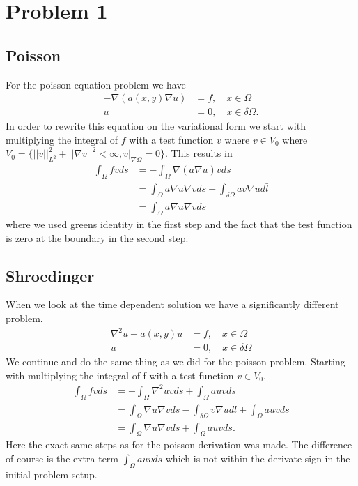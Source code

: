 \documentclass[11pt]{article}
\begin{document}
\section{Problem 1}
\subsection{Poisson}
For the poisson equation problem we have
\begin{align}
	-\nabla (a(x,y)\nabla u) &= f,\quad x\in \Omega \\
	u &= 0,\quad x\in \delta \Omega.
\end{align}
In order to rewrite this equation on the variational form we start with multiplying the integral of $f$ with a test function $v$ where $v\in V_0$ where $V_0 = \{ ||v||^2_{L^2} + ||\nabla v||^2 < \infty, v|_{\nabla \Omega} = 0\}$. This results in
\begin{align}
	\int_{\Omega} f v d s &= - \int_{\Omega} \nabla (a \nabla u) v ds \\
	&= \int_{\Omega} a \nabla u \nabla v ds - \int_{\delta \Omega} a v \nabla u d\bar{l} \\
	&= \int_{\Omega} a \nabla u \nabla v ds
\end{align}
where we used greens identity in the first step and the fact that the test function is zero at the boundary in the second step.
\subsection{Shroedinger}
When we look at the time dependent solution we have a significantly different problem.
\begin{align}
	\nabla^2 u + a(x,y) u &= f, \quad x\in \Omega \\
	u &= 0, \quad x \in \delta \Omega
\end{align}
We continue and do the same thing as we did for the poisson problem. Starting with multiplying the integral of f with a test function $v \in V_0$.
\begin{align}
	\int_{\Omega} f v d s &= - \int_{\Omega} \nabla^2 u v ds + \int_{\Omega} auv ds \\
	&= \int_{\Omega} \nabla u\nabla vds-\int_{\delta\Omega} v \nabla u d\bar{l} + \int_{\Omega} auvds \\
	&= \int_{\Omega} \nabla u \nabla v ds + \int_{\Omega} a u v ds.
\end{align}
Here the exact same steps as for the poisson derivation was made. The difference of course is the extra term $\int_{\Omega} a u v ds$ which is not within the derivate sign in the initial problem setup.
\end{document}
